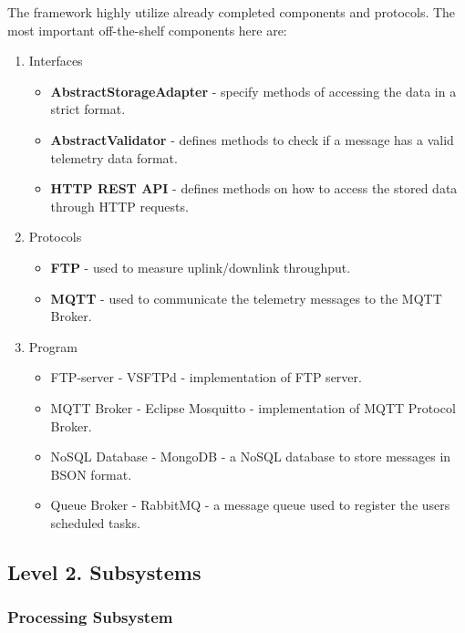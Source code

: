 The framework highly utilize already completed components and protocols.
The most important off-the-shelf components here are:

\begin{enumerate}
\def\labelenumi{\arabic{enumi}.}
\tightlist
\item
  Interfaces

  \begin{itemize}
  \item
    \textbf{AbstractStorageAdapter} - specify methods of accessing the
    data in a strict format.
  \item
    \textbf{AbstractValidator} - defines methods to check if a message
    has a valid telemetry data format.
  \item
    \textbf{HTTP REST API} - defines methods on how to access the stored
    data through HTTP requests.
  \end{itemize}
\item
  Protocols

  \begin{itemize}
  \item
    \textbf{FTP} - used to measure uplink/downlink throughput.
  \item
    \textbf{MQTT} - used to communicate the telemetry messages to the
    MQTT Broker.
  \end{itemize}
\item
  Program

  \begin{itemize}
  \item
    FTP-server - VSFTPd - implementation of FTP server.
  \item
    MQTT Broker - Eclipse Mosquitto - implementation of MQTT Protocol
    Broker.
  \item
    NoSQL Database - MongoDB - a NoSQL database to store messages in
    BSON format.
  \item
    Queue Broker - RabbitMQ - a message queue used to register the users
    scheduled tasks.
  \end{itemize}
\end{enumerate}

\subsection{Level 2. Subsystems}\label{level-2.-subsystems}

\subsubsection{Processing Subsystem}\label{processing-subsystem}

